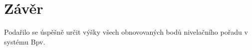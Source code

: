\section{Závěr}

Podařilo se úspěšně určit výšky všech obnovovaných bodů nivelačního pořadu v systému Bpv.
